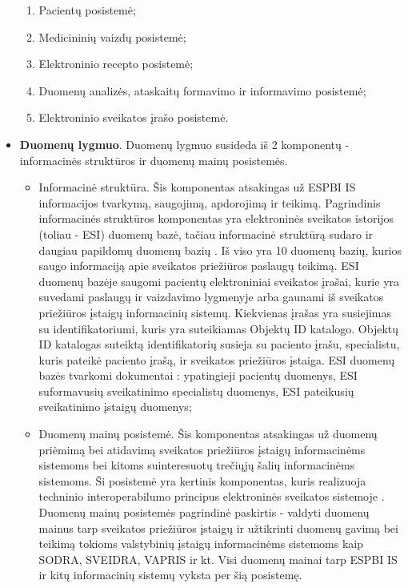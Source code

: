 \begin{itemize}
    \begin{enumerate}
        \item Pacientų posistemė;
        \item Medicininių vaizdų posistemė;
        \item Elektroninio recepto posistemė;
        \item Duomenų analizės, ataskaitų formavimo ir informavimo posistemė;
        \item Elektroninio sveikatos įrašo posistemė.
    \end{enumerate}
    \item \textbf{Duomenų lygmuo}. Duomenų lygmuo susideda iš 2 komponentų - informacinės struktūros ir duomenų mainų posistemės.
    \begin{itemize}
        \item Informacinė struktūra. Šis komponentas atsakingas už ESPBI IS informacijos tvarkymą, saugojimą, apdorojimą ir teikimą. Pagrindinis informacinės struktūros komponentas yra elektroninės sveikatos istorijos (toliau - ESI) duomenų bazė, tačiau informacinė struktūrą sudaro ir daugiau papildomų duomenų bazių \cite{Specifikacija}. Iš viso yra 10 duomenų bazių, kurios saugo informaciją apie sveikatos priežiūros paslaugų teikimą. ESI duomenų bazėje saugomi pacientų elektroniniai sveikatos įrašai, kurie yra suvedami paslaugų ir vaizdavimo lygmenyje arba gaunami iš sveikatos priežiūros įstaigų informacinių sistemų. Kiekvienas įrašas yra susiejimas su identifikatoriumi, kuris yra suteikiamas Objektų ID katalogo. Objektų ID katalogas suteiktą identifikatorių susieja su paciento įrašu, specialistu, kuris pateikė paciento įrašą, ir sveikatos priežiūros įstaiga. ESI duomenų bazės tvarkomi dokumentai \cite{Specifikacija}: ypatingieji pacientų duomenys, ESI suformavusių sveikatinimo specialistų duomenys, ESI pateikusių sveikatinimo įstaigų duomenys;
        \item Duomenų mainų posistemė. Šis komponentas atsakingas už duomenų priėmimą bei atidavimą sveikatos priežiūros įstaigų informacinėms sistemoms bei kitoms suinteresuotų trečiųjų šalių informacinėms sistemoms. Ši posistemė yra kertinis komponentas, kuris realizuoja techninio interoperabilumo principus elektroninės sveikatos sistemoje \cite{Specifikacija}. Duomenų mainų posistemės pagrindinė paskirtis - valdyti duomenų mainus tarp sveikatos priežiūros įstaigų ir užtikrinti duomenų gavimą bei teikimą tokioms valstybinių įstaigų informacinėms sistemoms kaip SODRA, SVEIDRA, VAPRIS ir kt. Visi duomenų mainai tarp ESPBI IS ir kitų informacinių sistemų vyksta per šią posistemę.
    \end{itemize}
\end{itemize}

